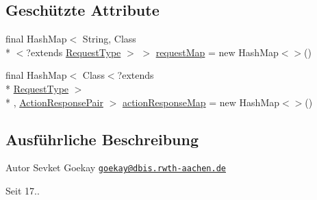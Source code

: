 \subsection*{Geschützte Attribute}
\begin{DoxyCompactItemize}
\item 
final Hash\+Map$<$ String, Class\\*
$<$?extends \hyperlink{interfacede_1_1rwth_1_1idsg_1_1steve_1_1ocpp_1_1_request_type}{Request\+Type} $>$ $>$ \hyperlink{classde_1_1rwth_1_1idsg_1_1steve_1_1ocpp_1_1ws_1_1_abstract_type_store_a591ed9920192486ad695bbad5463cdc8}{request\+Map} = new Hash\+Map$<$$>$()
\item 
final Hash\+Map$<$ Class$<$?extends \\*
\hyperlink{interfacede_1_1rwth_1_1idsg_1_1steve_1_1ocpp_1_1_request_type}{Request\+Type} $>$\\*
, \hyperlink{classde_1_1rwth_1_1idsg_1_1steve_1_1ocpp_1_1ws_1_1data_1_1_action_response_pair}{Action\+Response\+Pair} $>$ \hyperlink{classde_1_1rwth_1_1idsg_1_1steve_1_1ocpp_1_1ws_1_1_abstract_type_store_ac58fed0b3c17c657e6dea4e1310c667f}{action\+Response\+Map} = new Hash\+Map$<$$>$()
\end{DoxyCompactItemize}


\subsection{Ausführliche Beschreibung}
\begin{DoxyAuthor}{Autor}
Sevket Goekay \href{mailto:goekay@dbis.rwth-aachen.de}{\tt goekay@dbis.\+rwth-\/aachen.\+de} 
\end{DoxyAuthor}
\begin{DoxySince}{Seit}
17.. 
\end{DoxySince}


